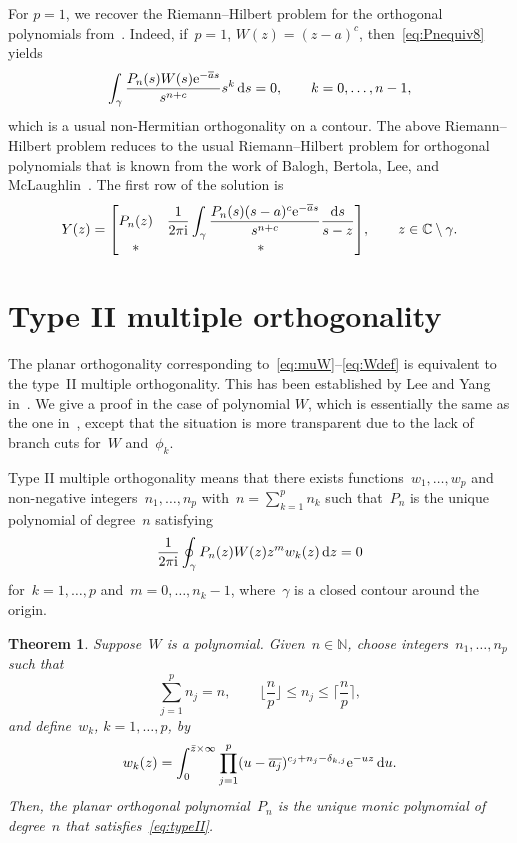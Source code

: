 \documentclass[pdftex]{sigma}
\numberwithin{equation}{section}
\newtheorem{Theorem}{Theorem}[section]
\newcommand*{\Cset}{\mathbb{C}} %
\newcommand*{\Nset}{\mathbb{N}} %
\begin{document}
 For $p=1$, we recover the Riemann--Hilbert problem for the orthogonal polynomials from~\cite{BBLM}. Indeed, if~$p=1$, $W(z)=(z-a)^c$, then~\eqref{eq:Pnequiv8} yields
 \begin{equation*}
 \int _{\gamma} \frac{P_n(s) W(s) {\rm e}^{-\overline{a} s}}{s^{n+c}} s^k\, {\rm d}s=0, \qquad k=0, \dots, n-1,
 \end{equation*}
 which is a usual non-Hermitian orthogonality on a contour. The above Riemann--Hilbert problem reduces to the usual Riemann--Hilbert problem for orthogonal polynomials that is known from the work of Balogh, Bertola, Lee, and McLaughlin~\cite{BBLM}. The first row of the solution is
 \begin{equation*}
 Y(z) =
 \begin{bmatrix}
 P_n(z) & \displaystyle \frac{1}{2\pi {\rm i}} \int_{\gamma} \frac{P_n(s) (s-a)^c {\rm e}^{-\overline{a} s}}{s^{n+c}} \frac{{\rm d}s}{s-z} \\
 * & *
 \end{bmatrix}\!, \qquad z \in \Cset \setminus \gamma.
 \end{equation*}


 \section{Type II multiple orthogonality}
 \label{section5}
 The planar orthogonality corresponding to~\eqref{eq:muW}--\eqref{eq:Wdef} is equivalent to the type~II multiple orthogonality. This has been established by Lee and Yang in~\cite{LY2}. We give a proof in the case of polynomial $W$, which is essentially the same as the one in~\cite{LY2}, except that the situation is more transparent due to the lack of branch cuts for~$W$ and~$\phi_k$.

 Type II multiple orthogonality means that there exists functions~$w_1, \dots, w_p$ and non-negative integers~$n_1, \dots, n_p$ with~$n = \sum_{k=1}^p n_k$ such that~$P_n$ is the unique polynomial of degree~$n$ satisfying
 \begin{equation}
 \label{eq:typeII}
 \frac{1}{2\pi {\rm i}} \oint_{\gamma} P_n(z) W(z) z^m w_k(z)\, {\rm d}z = 0
 \end{equation}
 for~$k=1, \dots, p$ and~$m = 0, \dots, n_k-1$, where~$\gamma$ is a closed contour around the origin.

 \begin{Theorem}
 \label{thm:typeII}
 Suppose~$W$ is a polynomial. Given~$n \in \Nset$, choose integers~$n_1, \dots, n_p$ such that
 \begin{equation}
 \label{eq:njdef}
 \sum_{j=1}^p n_j = n, \qquad
 \bigg\lfloor \frac{n}{p} \bigg\rfloor \leq n_j \leq \bigg\lceil \frac{n}{p}\bigg \rceil,
 \end{equation}
 and define~$w_k$, $k=1, \dots, p$, by
 \begin{equation} \label{eq:wkdef} w_k(z) = \int_0^{\bar{z} \times \infty} \prod_{j=1}^p (u-\overline{a_j})^{c_j + n_j-\delta_{k,j}} {\rm e}^{-uz} \, {\rm d}u.
 \end{equation}
 Then, the planar orthogonal polynomial~$P_n$ is the unique monic polynomial of degree~$n$ that satisfies~\eqref{eq:typeII}.
 \end{Theorem}
\end{document}
